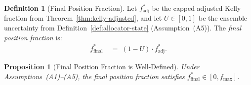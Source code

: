 \documentclass[12pt,openany]{book}
\numberwithin{equation}{chapter}
\theoremstyle{plain}
\newtheorem{proposition}[theorem]{Proposition}
\theoremstyle{definition}
\newtheorem{definition}[theorem]{Definition}
\theoremstyle{remark}
\numberwithin{equation}{chapter}
\theoremstyle{plain}
\begin{document}
\begin{definition}[Final Position Fraction]
\label{def:final-position-fraction}
Let $f^*_{\mathrm{adj}}$ be the capped adjusted Kelly fraction from
Theorem~\ref{thm:kelly-adjusted}, and let $U \in [0,1]$ be the
ensemble uncertainty from Definition~\ref{def:allocator-state}
(Assumption~\textup{(A5)}).  The \emph{final position fraction} is:
\begin{align}
  f^*_{\mathrm{final}}
  &\;=\; (1 - U)\cdot f^*_{\mathrm{adj}}.
  \label{eq:fractional-kelly}
\end{align}
\end{definition}

\begin{proposition}[Final Position Fraction is Well-Defined]
\label{prop:final-fraction-valid}
Under Assumptions~\textup{(A1)}--\textup{(A5)}, the final
position fraction satisfies $f^*_{\mathrm{final}} \in [0, f_{\max}]$.
\end{proposition}
\end{document}
